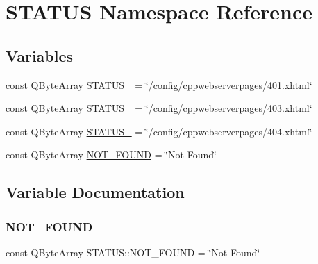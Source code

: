 \hypertarget{namespace_s_t_a_t_u_s}{}\section{S\+T\+A\+T\+US Namespace Reference}
\label{namespace_s_t_a_t_u_s}
\subsection*{Variables}
\begin{DoxyCompactItemize}
\item 
const Q\+Byte\+Array \hyperlink{namespace_s_t_a_t_u_s_aa4a6b01b0a8d4d16390203ccb3db4329}{S\+T\+A\+T\+U\+S\+\_} = \char`\"{}/config/cppwebserverpages/401.xhtml\char`\"{}
\item 
const Q\+Byte\+Array \hyperlink{namespace_s_t_a_t_u_s_a22f6a30ceecdec00ad50b18be4bf4558}{S\+T\+A\+T\+U\+S\+\_} = \char`\"{}/config/cppwebserverpages/403.xhtml\char`\"{}
\item 
const Q\+Byte\+Array \hyperlink{namespace_s_t_a_t_u_s_ad6c53872757b67a9407d122c0d117ea6}{S\+T\+A\+T\+U\+S\+\_} = \char`\"{}/config/cppwebserverpages/404.xhtml\char`\"{}
\item 
const Q\+Byte\+Array \hyperlink{namespace_s_t_a_t_u_s_a0d6fb875f90dbf7eae1a16bd4f182372}{N\+O\+T\+\_\+\+F\+O\+U\+ND} = \char`\"{}Not Found\char`\"{}
\end{DoxyCompactItemize}


\subsection{Variable Documentation}
\mbox{\label{namespace_s_t_a_t_u_s_a0d6fb875f90dbf7eae1a16bd4f182372}} 
\subsubsection{\texorpdfstring{N\+O\+T\+\_\+\+F\+O\+U\+ND}{NOT\_FOUND}}
{\footnotesize\ttfamily const Q\+Byte\+Array S\+T\+A\+T\+U\+S\+::\+N\+O\+T\+\_\+\+F\+O\+U\+ND = \char`\"{}Not Found\char`\"{}}

\mbox{\label{namespace_s_t_a_t_u_s_aa4a6b01b0a8d4d16390203ccb3db4329}} 
